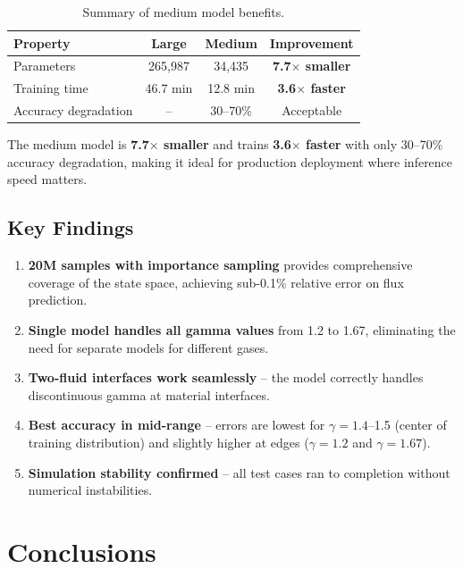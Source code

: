 \documentclass[11pt,a4paper]{article}
\begin{document}
\begin{table}[H]
\centering
\begin{tabular}{lccc}
\toprule
Property & Large & Medium & Improvement \\
\midrule
Parameters & 265,987 & 34,435 & \textbf{7.7$\times$ smaller} \\
Training time & 46.7 min & 12.8 min & \textbf{3.6$\times$ faster} \\
Accuracy degradation & -- & 30--70\% & Acceptable \\
\bottomrule
\end{tabular}
\caption{Summary of medium model benefits.}
\label{tab:medium_benefits}
\end{table}

The medium model is \textbf{7.7$\times$ smaller} and trains \textbf{3.6$\times$ faster} with only 30--70\% accuracy degradation, making it ideal for production deployment where inference speed matters.

\subsection{Key Findings}

\begin{enumerate}
    \item \textbf{20M samples with importance sampling} provides comprehensive coverage of the state space, achieving sub-0.1\% relative error on flux prediction.
    \item \textbf{Single model handles all gamma values} from 1.2 to 1.67, eliminating the need for separate models for different gases.
    \item \textbf{Two-fluid interfaces work seamlessly} -- the model correctly handles discontinuous gamma at material interfaces.
    \item \textbf{Best accuracy in mid-range} -- errors are lowest for $\gamma = 1.4$--1.5 (center of training distribution) and slightly higher at edges ($\gamma = 1.2$ and $\gamma = 1.67$).
    \item \textbf{Simulation stability confirmed} -- all test cases ran to completion without numerical instabilities.
\end{enumerate}

\section{Conclusions}
\end{document}
